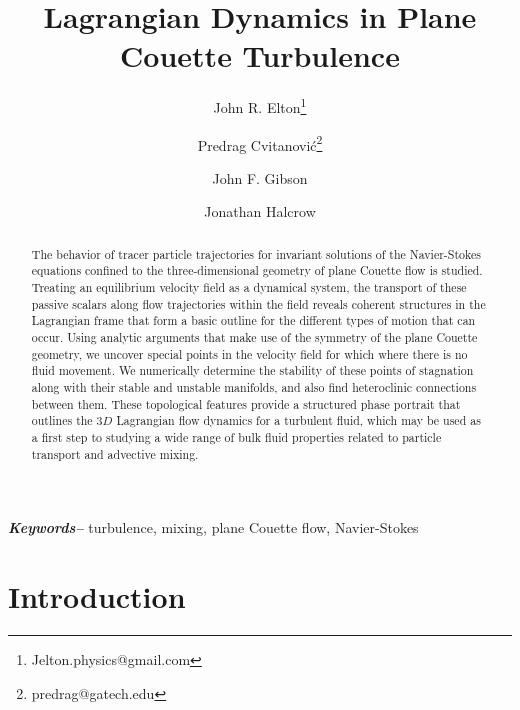 \documentclass[letter,12pt,openany]{article}
\title{Lagrangian Dynamics in Plane Couette Turbulence}
\author[1]{John R. Elton\thanks{Jelton.physics@gmail.com}}
\author[1]{Predrag Cvitanovi\'{c}\thanks{predrag@gatech.edu}}
\author[1]{John F. Gibson}
\author[1]{Jonathan Halcrow}
\affil[1]{Center for Nonlinear Science, School of Physics, Georgia Institute of Technology, Atlanta, GA}
\providecommand{\keywords}[1]
{
  \small	
  \textbf{\textit{Keywords--}} #1
}
\begin{document}
    
\date{}

\maketitle

\begin{abstract}
\noindent 
The behavior of tracer particle trajectories for invariant solutions of the Navier-Stokes equations confined to the three-dimensional geometry of plane Couette flow is studied. Treating an equilibrium velocity field as a dynamical system, the transport of these passive scalars along flow trajectories within the field reveals coherent structures in the Lagrangian frame that form a basic outline for the different types of motion that can occur. Using analytic arguments that make use of the symmetry of the plane Couette geometry, we uncover special points in the velocity field for which where there is no fluid movement. We numerically determine the stability of these points of stagnation along with their stable and unstable manifolds, and also find heteroclinic connections between them. These topological features provide a structured phase portrait that outlines the $3D$ Lagrangian flow dynamics for a turbulent fluid, which may be used as a first step to studying a wide range of bulk fluid properties related to particle transport and advective mixing.
\end{abstract}


\keywords{turbulence, mixing, plane Couette flow, Navier-Stokes}


\section{\centering Introduction}
\label{sec:intro}
\end{document}
